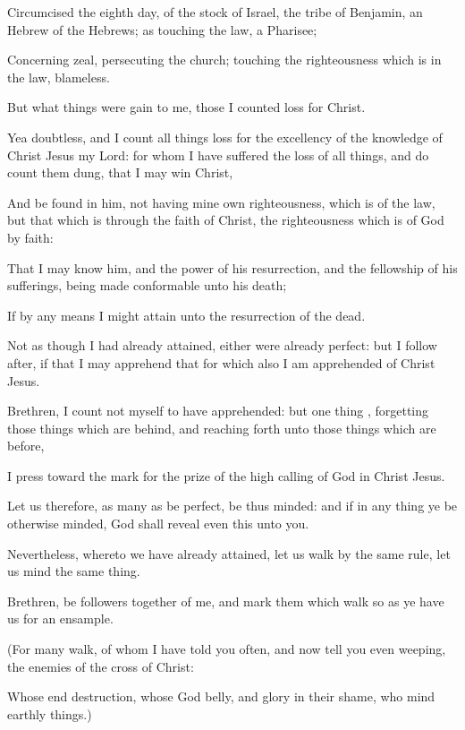 {Circumcised the eighth
day,
of the
stock of
Israel,
{} the
tribe of
Benjamin, an
Hebrew
of the
Hebrews; as
touching the
law, a
Pharisee;

Concerning
zeal,
persecuting the
church;
touching the
righteousness
which
is
in the
law,
blameless.

But what
things
were
gain to
me,
those I
counted
loss
for
Christ.

Yea
doubtless,
and I
count all
things
{}
loss
for the
excellency of the
knowledge of
Christ
Jesus
my
Lord:
for
whom I have suffered the loss
of all
things,
and do
count them
{}
dung,
that I may
win
Christ,

And be
found
in
him,
not
having mine
own
righteousness, which
is
of the
law,
but that which
is
through the
faith of
Christ, the
righteousness which
is
of
God
by
faith:

That I may
know
him,
and the
power
of
his
resurrection,
and the
fellowship
of
his
sufferings, being made conformable
unto
his
death;

If by any
means I might
attain
unto the
resurrection of the
dead.

Not as
though I
had
already
attained,
either
were
already
perfect:
but I follow
after,
if
that I may
apprehend that
for
which
also I am
apprehended
of
Christ
Jesus.

Brethren,
I
count
not
myself to have
apprehended:
but
{} one
thing
{},
forgetting those things which
are
behind,
and reaching
forth unto those things which
are
before,

I
press
toward the
mark
for the
prize of
the
high
calling of
God
in
Christ
Jesus.

Let
us
therefore, as many
as be
perfect, be
thus
minded:
and
if in any
thing ye
be
otherwise
minded,
God shall
reveal
even
this unto
you.

Nevertheless,
whereto we have already
attained, let us
walk by
the
same
rule, let us
mind the same
thing.

Brethren,
be followers
together of
me,
and
mark them which
walk so
as ye
have
us
for an
ensample.

(For
many
walk, of
whom I have
told
you
often,
and
now tell
you
even
weeping,
{} the
enemies of the
cross of
Christ:

Whose
end
{}
destruction,
whose
God
{}
belly,
and
{}
glory
{}
in
their
shame,
who
mind earthly
things.)

}
